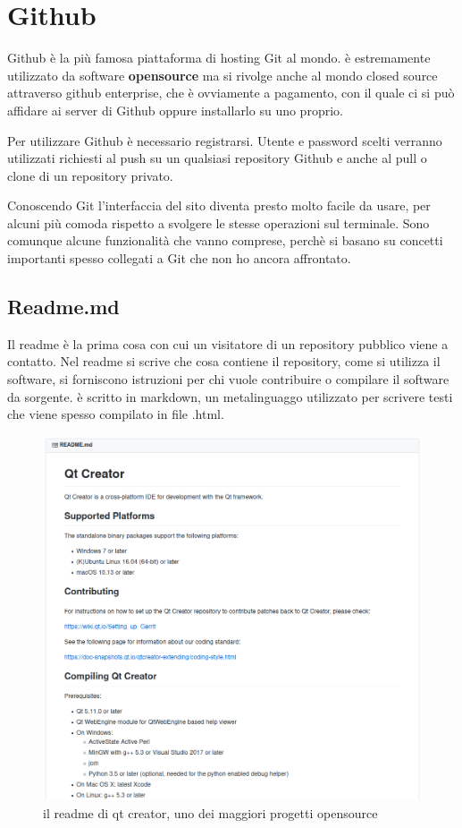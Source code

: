 \documentclass{article} \usepackage[textwidth=19cm,textheight=24cm]{geometry}
\begin{document}
\section{Github\label{github}}

Github è la più famosa piattaforma di hosting Git al mondo. è estremamente
utilizzato da software \textbf{opensource} ma si rivolge anche al mondo closed
source attraverso github enterprise, che è ovviamente a pagamento, con il quale
ci si può affidare ai server di Github oppure installarlo su uno proprio.

Per utilizzare Github è necessario registrarsi. Utente e password scelti
verranno utilizzati richiesti al push su un qualsiasi repository Github e anche
al pull o clone di un repository privato.

Conoscendo Git l'interfaccia del sito diventa presto molto facile da usare, per
alcuni più comoda rispetto a svolgere le stesse operazioni sul terminale.
Sono comunque alcune funzionalità che vanno comprese, perchè si basano su
concetti importanti spesso collegati a Git che non ho ancora affrontato.

\subsection{Readme.md}
Il readme è la prima cosa con cui un visitatore di un repository pubblico viene
a contatto. Nel readme si scrive che cosa contiene il repository, come si
utilizza il software, si forniscono istruzioni per chi vuole contribuire o 
compilare il software da sorgente.
è scritto in markdown, un metalinguaggo utilizzato per scrivere testi che viene
spesso compilato in file .html.

\begin{figure}
\includegraphics[width=6in]{img/readme.png}
\centering
\caption{il readme di qt creator, uno dei maggiori progetti opensource}
\end{figure}
\end{document}
